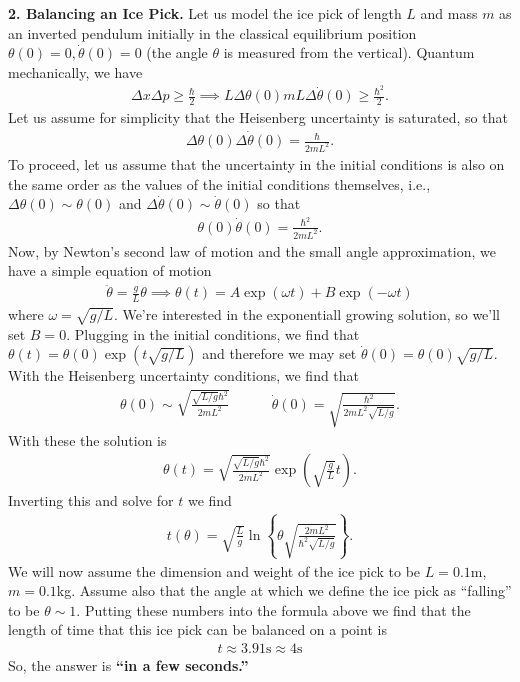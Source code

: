 \documentclass{article}
\theoremstyle{definition}
\newcommand{\f}[2]{\frac{#1}{#2}}
\newcommand{\lp}{\left(}
\newcommand{\rp}{\right)}
\newcommand{\lc}{\left\{}
\newcommand{\rc}{\right\}}
\begin{document}
\noindent \textbf{2. Balancing an Ice Pick.} Let us model the ice pick of length $L$ and mass $m$ as an inverted pendulum initially in the classical equilibrium position $\theta(0) = 0, \dot\theta(0) = 0$ (the angle $\theta$ is measured from the vertical). Quantum mechanically, we have
\begin{align*}
\Delta x \Delta p \geq \f{\hbar}{2} \implies L \Delta \theta(0) mL \Delta\dot\theta(0) \geq \f{\hbar^2}{2}.   
\end{align*}
Let us assume for simplicity that the Heisenberg uncertainty is saturated, so that 
\begin{align*}
\Delta \theta(0) \Delta \dot \theta(0) = \f{\hbar}{2mL^2}.
\end{align*}
To proceed, let us assume that the uncertainty in the initial conditions is also on the same order as the values of the initial conditions themselves, i.e., $\Delta \theta(0) \sim \theta(0)$ and $\Delta \dot \theta(0) \sim \dot\theta(0)$ so that
\begin{align*}
\theta(0)\dot\theta(0) = \f{\hbar^2}{2mL^2}.
\end{align*}
Now, by Newton's second law of motion and the small angle approximation, we have a simple equation of motion
\begin{align*}
\ddot\theta = \f{g}{L}\theta \implies \theta(t) = A\exp(\omega t) + B\exp(-\omega t)
\end{align*}
where $\omega = \sqrt{g/L}$. We're interested in the exponentiall growing solution, so we'll set $B=0$. Plugging in the initial conditions, we find that $\theta(t) = \theta(0)\exp(t\sqrt{g/L})$ and therefore we may set $\dot \theta(0) = \theta(0)\sqrt{g/L}$. With the Heisenberg uncertainty conditions, we find that
\begin{align*}
\theta(0) \sim \sqrt{\f{\sqrt{L/g}\hbar^2}{2mL^2}} \quad\quad\quad \dot\theta(0) = \sqrt{\f{\hbar^2}{2mL^2 \sqrt{L/g}}}.
\end{align*}
With these the solution is 
\begin{align*}
\theta(t) = \sqrt{\f{\sqrt{L/g}\hbar^2}{2mL^2}} \exp \lp \sqrt{\f{g}{L}}t \rp.
\end{align*}
Inverting this and solve for $t$ we find 
\begin{align*}
t(\theta) = \sqrt{\f{L}{g}}\ln \lc \theta \sqrt{\f{2mL^2}{\hbar^2 \sqrt{L/g}}} \rc.
\end{align*}
We will now assume the dimension and weight of the ice pick to be $L = 0.1$m, $m = 0.1$kg. Assume also that the angle at which we define the ice pick as ``falling'' to be $\theta \sim 1$. Putting these numbers into the formula above we find that the length of time that this ice pick can be balanced on a point is
\begin{align*}
t \approx 3.91\text{s} \approx 4 \text{s}
\end{align*}
So, the answer is \textbf{``in a few seconds.''}\\
\end{document}
